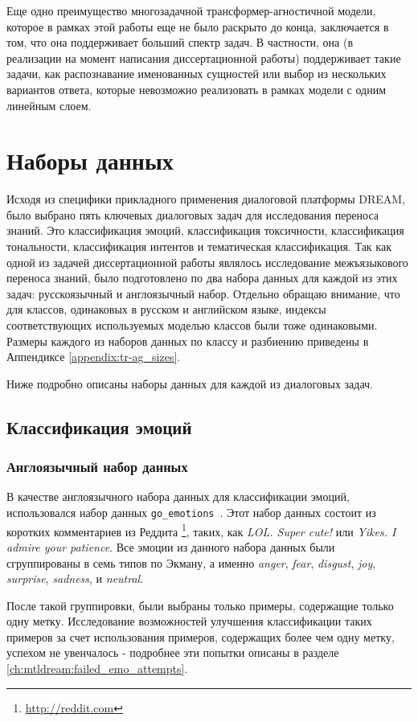 Еще одно преимущество многозадачной трансформер-агностичной модели, которое в рамках этой работы еще не было раскрыто до конца, заключается в том, что она поддерживает больший спектр задач. В частности, она (в реализации на момент написания диссертационной работы) поддерживает такие задачи, как распознавание именованных сущностей или выбор из нескольких вариантов ответа, которые невозможно реализовать в рамках модели с одним линейным слоем. 


\section{Наборы данных}

Исходя из специфики прикладного применения диалоговой платформы DREAM, было выбрано пять ключевых диалоговых задач для исследования переноса знаний. Это классификация эмоций, классификация токсичности, классификация тональности, классификация интентов и тематическая классификация. Так как одной из задачей диссертационной работы являлось исследование межъязыкового переноса знаний, было подготовлено по два набора данных для каждой из этих задач: русскоязычный и англоязычный набор. Отдельно обращаю внимание, что для классов, одинаковых в русском и английском языке, индексы соответствующих используемых моделью классов были тоже одинаковыми. Размеры каждого из наборов данных по классу и разбиению приведены в Аппендиксе \ref{appendix:tr-ag_sizes}. 

Ниже подробно описаны наборы данных для каждой из диалоговых задач. 

\subsection{Классификация эмоций}
\subsubsection{Англоязычный набор данных} 
В качестве англоязычного набора данных для классификации эмоций, использовался набор данных  \texttt{go\_emotions}~\cite{emotions}. Этот набор данных состоит из коротких комментариев из Реддита \footnote{\url{http://reddit.com}}, таких, как \textit{LOL. Super cute!} или \textit{Yikes. I admire your patience}. Все эмоции из данного набора данных были сгруппированы в семь типов по Экману, а именно \textit{anger}, \textit{fear}, \textit{disgust}, \textit{joy}, \textit{surprise}, \textit{sadness}, и \textit{neutral}. 

После такой группировки, были выбраны только примеры, содержащие только одну метку. Исследование возможностей улучшения классификации таких примеров за счет использования примеров, содержащих более чем одну метку, успехом не увенчалось - подробнее эти попытки описаны в разделе \ref{ch:mtldream:failed_emo_attempts}. 

